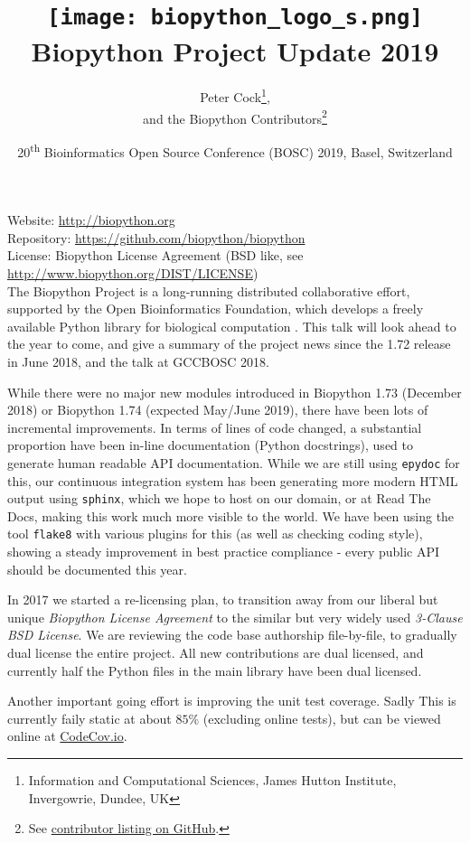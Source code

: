 \documentclass[10pt,oneside]{article}
\title{%
\vspace{-1.5in}
\texttt{[image: biopython\_logo\_s.png]} \\
\vspace{3mm}Biopython Project Update 2019}
\author{
    Peter Cock\thanks{Information and Computational Sciences, James Hutton Institute, Invergowrie, Dundee, UK},\\
    and the Biopython Contributors\thanks{See \href{https://github.com/biopython/biopython/blob/master/CONTRIB.rst}{contributor listing on GitHub}.}}
\date{20\textsuperscript{th} Bioinformatics Open Source Conference (BOSC) 2019, Basel, Switzerland}
\begin{document}
\maketitle
\thispagestyle{empty}

\vspace{-0.2in}
\noindent
Website: \url{http://biopython.org} \\
Repository: \url{https://github.com/biopython/biopython} \\
License: Biopython License Agreement (BSD like, see \url{http://www.biopython.org/DIST/LICENSE}) \\

The Biopython Project is a long-running distributed collaborative effort,
supported by the Open Bioinformatics Foundation, which develops a freely
available Python library for biological computation \cite{AppNote}. This
talk will look ahead to the year to come, and give a summary of the project
news since the 1.72 release in June 2018, and the talk at GCCBOSC 2018.

While there were no major new modules introduced in Biopython 1.73
(December 2018) or Biopython 1.74 (expected May/June 2019), there have
been lots of incremental improvements.
In terms of lines of code changed, a substantial proportion have been
in-line documentation (Python docstrings), used to generate human readable
API documentation. While we are still using \texttt{epydoc} for this, our continuous
integration system has been generating more modern HTML output using \texttt{sphinx},
which we hope to host on our domain, or at Read The Docs, making this work
much more visible to the world. We have been using the tool \texttt{flake8}
with various plugins for this (as well as checking coding style), showing
a steady improvement in best practice compliance - every public API should
be documented this year.

In 2017 we started a re-licensing plan, to transition away
from our liberal but unique \emph{Biopython License Agreement} to the similar
but very widely used \emph{3-Clause BSD License}. We are reviewing the code
base authorship file-by-file, to gradually dual license the entire project.
All new contributions are dual licensed, and currently half the Python files
in the main library have been dual licensed.

Another important going effort is improving the unit test coverage. Sadly
This is currently faily static at about $85\%$ (excluding online tests),
but can be viewed online at
\href{https://codecov.io/github/biopython/biopython/}{CodeCov.io}.
\end{document}
